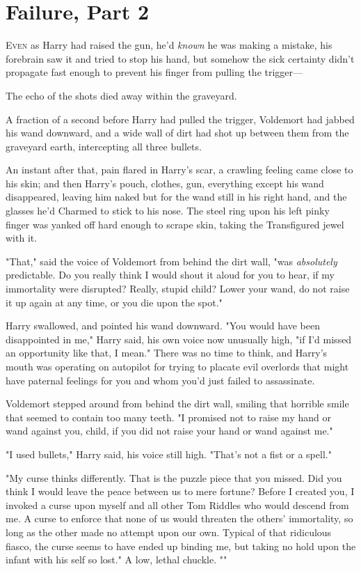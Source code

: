 \chapter{Failure, Part 2}

\lettrine{E}{ven} as Harry had
raised the gun, he'd \emph{known} he was making a mistake, his forebrain saw it
and tried to stop his hand, but somehow the sick certainty didn't propagate
fast enough to prevent his finger from pulling the trigger---

The echo of the shots died away within the graveyard.

A fraction of a second before Harry had pulled the trigger, Voldemort had
jabbed his wand downward, and a wide wall of dirt had shot up between them from
the graveyard earth, intercepting all three bullets.

An instant after that, pain flared in Harry's scar, a crawling feeling came
close to his skin; and then Harry's pouch, clothes, gun, everything except his
wand disappeared, leaving him naked but for the wand still in his right hand,
and the glasses he'd Charmed to stick to his nose. The steel ring upon his left
pinky finger was yanked off hard enough to scrape skin, taking the Transfigured
jewel with it.

"That," said the voice of Voldemort from behind the dirt wall, "was
\emph{absolutely} predictable. Do you really think I would shout it aloud for
you to hear, if my immortality were disrupted? Really, stupid child? Lower your
wand, do not raise it up again at any time, or you die upon the spot."

Harry swallowed, and pointed his wand downward. "You would have been
disappointed in me," Harry said, his own voice now unusually high, "if I'd
missed an opportunity like that, I mean." There was no time to think, and
Harry's mouth was operating on autopilot for trying to placate evil overlords
that might have paternal feelings for you and whom you'd just failed to
assassinate.

Voldemort stepped around from behind the dirt wall, smiling that horrible smile
that seemed to contain too many teeth. "I promised not to raise my hand or wand
against you, child, if you did not raise your hand or wand against me."

"I used bullets," Harry said, his voice still high. "That's not a fist or a
spell."

"My curse thinks differently. That is the puzzle piece that you missed. Did you
think I would leave the peace between us to mere fortune? Before I created you,
I invoked a curse upon myself and all other Tom Riddles who would descend from
me. A curse to enforce that none of us would threaten the others' immortality,
so long as the other made no attempt upon our own. Typical of that ridiculous
fiasco, the curse seems to have ended up binding me, but taking no hold upon
the infant with his self so lost." A low, lethal chuckle. ""


